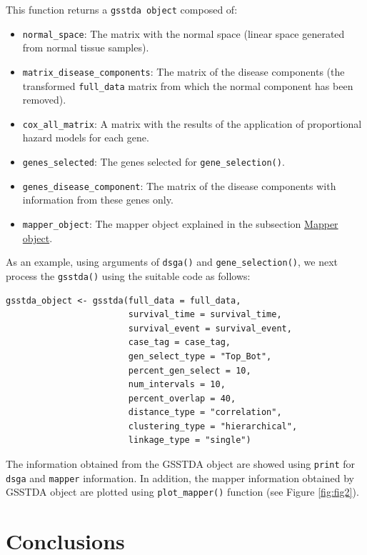 This function returns a \texttt{gsstda\ object} composed of:

\begin{itemize}
\tightlist
\item
  \texttt{normal\_space}: The matrix with the normal space (linear space generated from normal tissue samples).
\item
  \texttt{matrix\_disease\_components}: The matrix of the disease components (the transformed \texttt{full\_data} matrix from which the normal component has been removed).
\item
  \texttt{cox\_all\_matrix}: A matrix with the results of the application of proportional hazard models for each gene.
\item
  \texttt{genes\_selected}: The genes selected for \texttt{gene\_selection()}.
\item
  \texttt{genes\_disease\_component}: The matrix of the disease components with information from these genes only.
\item
  \texttt{mapper\_object}: The mapper object explained in the subsection \protect\hyperlink{section4.3}{Mapper object}.
\end{itemize}

As an example, using arguments of \texttt{dsga()} and \texttt{gene\_selection()}, we next process the \texttt{gsstda()} using the suitable code as follows:

\begin{verbatim}
gsstda_object <- gsstda(full_data = full_data,
                        survival_time = survival_time, 
                        survival_event = survival_event,
                        case_tag = case_tag, 
                        gen_select_type = "Top_Bot", 
                        percent_gen_select = 10, 
                        num_intervals = 10,
                        percent_overlap = 40, 
                        distance_type = "correlation", 
                        clustering_type = "hierarchical", 
                        linkage_type = "single")
\end{verbatim}

The information obtained from the GSSTDA object are showed using \texttt{print} for \texttt{dsga} and \texttt{mapper} information. In addition, the mapper information obtained by GSSTDA object are plotted using \texttt{plot\_mapper()} function (see Figure \ref{fig:fig2}).

\hypertarget{section5}{%
\section{Conclusions}\label{section5}}

